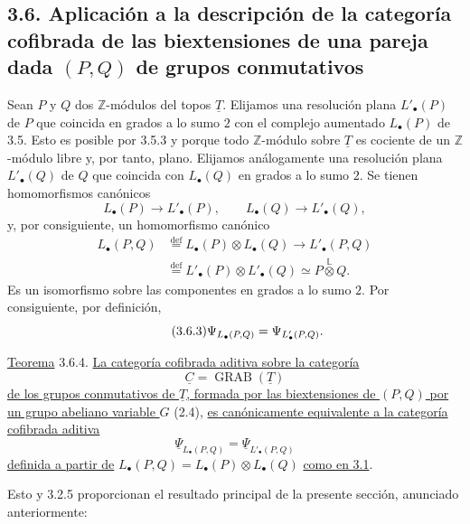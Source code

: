 \subsection*{3.6. Aplicación a la descripción de la categoría cofibrada
de las biextensiones de una pareja dada $(P,Q)$ de grupos conmutativos}

Sean $P$ y $Q$ dos $\mathbb Z$-módulos del topos $\underline T$.
Elijamos una resolución plana $L'_\bullet(P)$ de $P$ que coincida en
grados a lo sumo $2$ con el complejo aumentado $L_\bullet(P)$ de 3.5.
Esto es posible por 3.5.3 y porque todo $\mathbb Z$-módulo sobre
$\underline T$ es cociente de un $\mathbb Z$-módulo libre y, por tanto,
plano. Elijamos análogamente una resolución plana $L'_\bullet(Q)$ de $Q$
que coincida con $L_\bullet(Q)$ en grados a lo sumo $2$. Se tienen
homomorfismos canónicos
\begin{equation}\tag{3.6.1}
 L_\bullet(P)\longrightarrow L'_\bullet(P),
 \qquad
 L_\bullet(Q)\longrightarrow L'_\bullet(Q),
\end{equation}
y, por consiguiente, un homomorfismo canónico
\begin{equation}\tag{3.6.2}
\begin{split}
 L_\bullet(P,Q)
 &\overset{\mathrm{def}}{=}L_\bullet(P)\otimes L_\bullet(Q)
 \longrightarrow L'_\bullet(P,Q)\\
 &\overset{\mathrm{def}}{=}L'_\bullet(P)\otimes L'_\bullet(Q)
 \simeq P\mathbin{\overset{\mathbb L}{\otimes}}Q.
\end{split}
\end{equation}
Es un isomorfismo sobre las componentes en grados a lo sumo $2$. Por
consiguiente, por definición,
\begin{equation}\tag{3.6.3}
 \underline\Psi_{L_\bullet(P,Q)}
 =
 \sisi{\underline\Psi_{L_\bullet(P',Q')}}%
       {\underline\Psi_{L'_\bullet(P,Q)}}.
\end{equation}

\underline{Teorema} 3.6.4. \underline{La categoría cofibrada aditiva
sobre la categoría}
\[
 \underline C=\operatorname{GRAB}(\underline T)
\]
\underline{de los grupos conmutativos de $\underline T$, formada por las
biextensiones de $(P,Q)$ por un grupo abeliano variable $G$} (2.4),
\underline{es canónicamente equivalente a la categoría cofibrada aditiva}
\[
 \underline\Psi_{L_\bullet(P,Q)}
 =
 \underline\Psi_{L'_\bullet(P,Q)}
\]
\underline{definida a partir de}
$L_\bullet(P,Q)=L_\bullet(P)\otimes L_\bullet(Q)$
\underline{como en 3.1}.

Esto y 3.2.5 proporcionan el resultado principal de la presente sección,
anunciado anteriormente:

